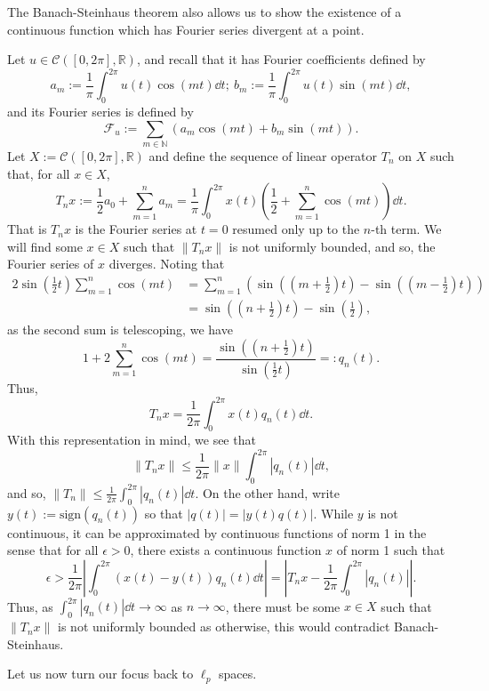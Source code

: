 \documentclass[]{article}
\theoremstyle{definition}
\theoremstyle{definition}
\begin{document}
The Banach-Steinhaus theorem also allows us to show the existence of a 
continuous function which has Fourier series divergent at a point.

Let \(u \in \mathcal{C}([0, 2\pi], \mathbb{R})\), and recall that it 
has Fourier coefficients defined by 
\[a_m := \frac{1}{\pi} \int_0^{2\pi} u(t) \cos(mt) \dd t; \ 
  b_m := \frac{1}{\pi} \int_0^{2\pi} u(t) \sin(mt) \dd t,\]
and its Fourier series is defined by 
\[\mathcal{F}_u := \sum_{m \in \mathbb{N}}(a_m \cos(mt) + b_m\sin(mt)).\]
Let \(X := \mathcal{C}([0, 2\pi], \mathbb{R})\) and define the sequence of 
linear operator \(T_n\) on \(X\) such that, for all \(x \in X\),
\[T_n x := \frac{1}{2}a_0 + \sum_{m = 1}^n a_m = 
  \frac{1}{\pi}\int_0^{2\pi}x(t)\left(\frac{1}{2} + 
  \sum_{m = 1}^n \cos(mt)\right) \dd t.\]
That is \(T_n x\) is the Fourier series at \(t = 0\) resumed only up to 
the \(n\)-th term. We will find some \(x \in X\) such that \(\|T_n x\|\) 
is not uniformly bounded, and so, the Fourier series of \(x\) diverges.
Noting that 
\[\begin{split}
  2 \sin\left(\frac{1}{2}t\right) \sum_{m = 1}^n \cos(mt) & = 
  \sum_{m = 1}^n \left(
    \sin\left(\left(m + \frac{1}{2}\right)t\right) - 
    \sin\left(\left(m - \frac{1}{2}\right)t\right)
  \right)\\
  & = \sin\left(\left(n + \frac{1}{2}\right)t\right) - 
    \sin \left(\frac{1}{2}\right),
\end{split}\]
as the second sum is telescoping, we have 
\[1 + 2 \sum_{m = 1}^n \cos(mt) = 
\frac{\sin\left(\left(n + \frac{1}{2}\right)t\right)}
{\sin\left(\frac{1}{2}t\right)} =: q_n(t).\]
Thus, 
\[T_n x = \frac{1}{2\pi}\int_0^{2\pi} x(t)q_n(t) \dd t.\]
With this representation in mind, we see that 
\[\|T_n x\| \le \frac{1}{2\pi} \|x\| \int_0^{2\pi}|q_n(t)| \dd t,\]
and so, \(\|T_n\| \le \frac{1}{2\pi}\int_0^{2\pi}|q_n(t)| \dd t\).
On the other hand, write \(y(t) := \text{sign}(q_n(t))\) so that 
\(|q(t)| = |y(t)q(t)|\). While \(y\) is not continuous, it can be 
approximated by continuous functions of norm 1 in the sense that for all 
\(\epsilon > 0\), there exists a continuous function \(x\) of norm 1 such that 
\[\epsilon > \frac{1}{2\pi}\left|\int_0^{2\pi} (x(t) - y(t))q_n(t) \dd t \right|
  = \left|T_n x - \frac{1}{2\pi} \int_0^{2\pi} |q_n(t)|\right|.\]
Thus, as \(\int_0^{2\pi} |q_n(t)| \dd t \to \infty\) as \(n \to \infty\), 
there must be some \(x \in X\) such that \(\|T_n x\|\) is not uniformly 
bounded as otherwise, this would contradict Banach-Steinhaus. 

Let us now turn our focus back to \(\ell_p\) spaces. 
\end{document}
